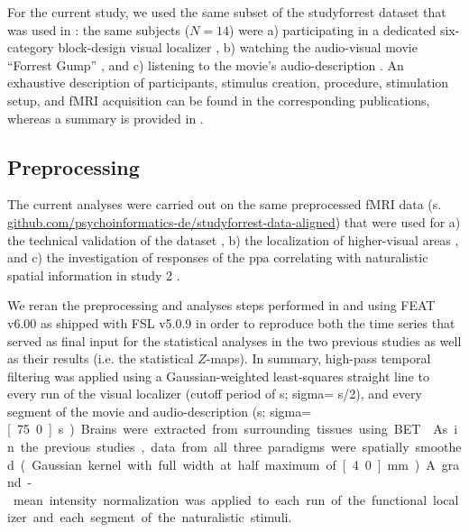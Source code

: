 For the current study, we used the same subset of the studyforrest dataset that
was used in \citet{haeusler2022processing}:
%
the same subjects ($N=14$) were
a) participating in a dedicated six-category block-design visual localizer
\citep{sengupta2016extension},
b) watching the audio-visual movie ``Forrest Gump''
\citep{hanke2016simultaneous}, and
c) listening to the movie's audio-description \citep{hanke2014audiomovie}.
An exhaustive description of participants, stimulus creation, procedure,
stimulation setup, and fMRI acquisition can be found in the corresponding
publications, whereas a summary is provided in \citet{haeusler2022processing}.



\subsection{Preprocessing}

The current analyses were carried out on the same preprocessed fMRI data (s.
\href{https://github.com/psychoinformatics-de/studyforrest-data-aligned
}{\url{github.com/psychoinformatics-de/studyforrest-data-aligned}}) that were
used for
%
a) the technical validation of the dataset \citep{hanke2016simultaneous},
%
b) the localization of higher-visual areas \citep{sengupta2016extension}, and
%
c) the investigation of responses of the \ac{ppa} correlating with naturalistic
spatial information in study 2 \citep{haeusler2022processing}.

%
We reran the preprocessing and analyses steps performed in
\citet{sengupta2016extension} and \citet{haeusler2022processing} using FEAT
v6.00 \citep[FMRI Expert Analysis Tool;][]{woolrich2001autocorr} as shipped with
FSL v5.0.9 \citep[\href{https://www.fmrib.ox.ac.uk/fsl}{FMRIB's Software
Library;}][]{smith2004fsl} in order to reproduce both the time series that
served as final input for the statistical analyses in the two previous studies
as well as their results (i.e. the statistical $Z$-maps).
In summary, high-pass temporal filtering was applied using a Gaussian-weighted
least-squares straight line to every run of the visual localizer (cutoff period
of \unit[100]{s}; sigma= \unit[100]{s}/2), and every segment of the
movie and audio-description (\unit[150]{s}; sigma=\unit[75.0]{s}).
Brains were extracted from surrounding tissues using BET \citep{smith2002bet}.
As in the previous studies, data from all three paradigms were spatially
smoothed (Gaussian kernel with full width at half maximum of \unit[4.0]{mm}).
A grand-mean intensity normalization was applied to each run of the functional
localizer and each segment of the naturalistic stimuli.

